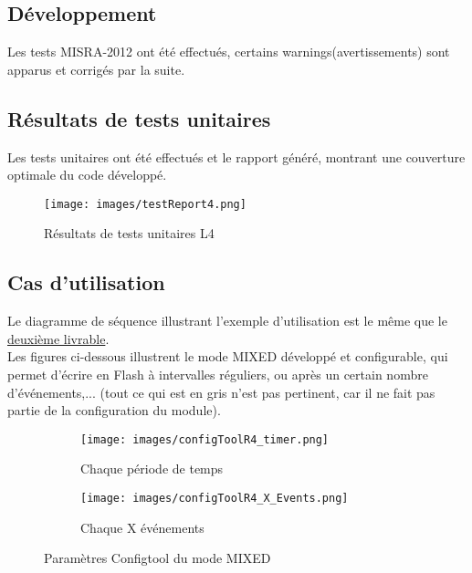 \documentclass[a4paper, 12pt]{report}
\begin{document}
\subsection{Développement}
Les tests MISRA-2012 ont été effectués, certains warnings(avertissements) sont apparus et corrigés par la suite. 

   \subsection{Résultats de tests unitaires}
    Les tests unitaires ont été effectués et le rapport généré, montrant une couverture
    optimale du code développé.
   \begin{figure}[H]
       \centering
       \texttt{[image: images/testReport4.png]}
       \caption{Résultats de tests unitaires L4}
       \label{fig:testU_L2}
   \end{figure}

   \subsection{Cas d'utilisation}
    Le diagramme de séquence illustrant l'exemple d'utilisation est le même que le \hyperref[fig:ExempleL2]{deuxième livrable}.\\

    Les figures ci-dessous illustrent le mode MIXED développé et configurable, qui permet d’écrire en Flash à intervalles réguliers, ou après un certain nombre d’événements,... (tout ce qui est en gris n'est pas pertinent, car il ne fait pas partie de la configuration du module).

            \begin{figure}[H]
             \centering
             \begin{subfigure}[t]{0.49\textwidth}
                 \centering
                 \texttt{[image: images/configToolR4\_timer.png]}
                 \caption{Chaque période de temps}
                 \label{filtre8}
             \end{subfigure}
             \hfill
             \begin{subfigure}[t]{0.49\textwidth}
             \centering
             \texttt{[image: images/configToolR4\_X\_Events.png]}
             \caption{Chaque X événements}
            \label{filtre7}
             \end{subfigure}
             \centering
             \caption{Paramètres Configtool du mode MIXED}
                \label{filtres}
            \end{figure}
\end{document}
